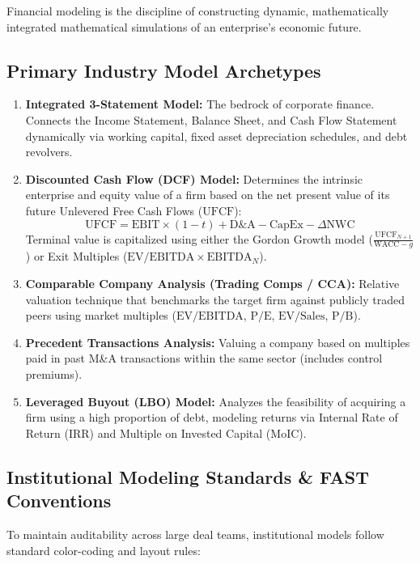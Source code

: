 \documentclass[11pt,a4paper]{article}
\begin{document}
Financial modeling is the discipline of constructing dynamic, mathematically integrated mathematical simulations of an enterprise's economic future.

\subsection{Primary Industry Model Archetypes}

\begin{enumerate}
  \item \textbf{Integrated 3-Statement Model:} The bedrock of corporate finance. Connects the Income Statement, Balance Sheet, and Cash Flow Statement dynamically via working capital, fixed asset depreciation schedules, and debt revolvers.
  \item \textbf{Discounted Cash Flow (DCF) Model:} Determines the intrinsic enterprise and equity value of a firm based on the net present value of its future Unlevered Free Cash Flows ($\text{UFCF}$):
  \begin{equation}
  \text{UFCF} = \text{EBIT} \times (1 - t) + \text{D\&A} - \text{CapEx} - \Delta\text{NWC}
  \end{equation}
  Terminal value is capitalized using either the Gordon Growth model ($\frac{\text{UFCF}_{N+1}}{\text{WACC} - g}$) or Exit Multiples ($\text{EV/EBITDA} \times \text{EBITDA}_N$).
  \item \textbf{Comparable Company Analysis (Trading Comps / CCA):} Relative valuation technique that benchmarks the target firm against publicly traded peers using market multiples ($\text{EV/EBITDA}$, $\text{P/E}$, $\text{EV/Sales}$, $\text{P/B}$).
  \item \textbf{Precedent Transactions Analysis:} Valuing a company based on multiples paid in past M\&A transactions within the same sector (includes control premiums).
  \item \textbf{Leveraged Buyout (LBO) Model:} Analyzes the feasibility of acquiring a firm using a high proportion of debt, modeling returns via Internal Rate of Return (IRR) and Multiple on Invested Capital (MoIC).
\end{enumerate}

\subsection{Institutional Modeling Standards \& FAST Conventions}

To maintain auditability across large deal teams, institutional models follow standard color-coding and layout rules:
\end{document}
